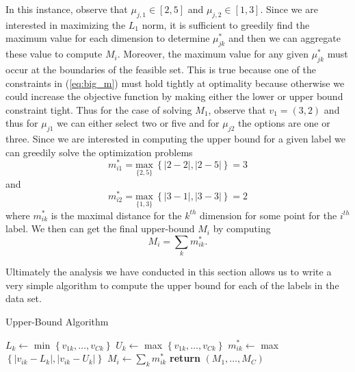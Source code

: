 \documentclass[../thesis.tex]{subfiles}
\begin{document}
In this instance, observe that $\mu_{j, 1} \in [2, 5]$ and $\mu_{j, 2} \in [1, 3]$. Since we are interested in maximizing the $L_1$ norm, it is sufficient to greedily find the maximum value for each dimension to determine $\mu_{jk}^*$ and then we can aggregate these value to compute $M_i$. Moreover, the maximum value for any given $\mu_{jk}^*$ must occur at the boundaries of the feasible set. This is true because one of the constraints in (\ref{eq:big_m}) must hold tightly at optimality because otherwise we could increase the objective function by making either the lower or upper bound constraint tight. Thus for the case of solving $M_1$, observe that $v_1 = (3, 2)$ and thus for $\mu_{j1}$ we can either select two or five and for $\mu_{j2}$ the options are one or three. Since we are interested in computing the upper bound for a given label we can greedily solve the optimization problems
\begin{equation*}
    m_{i1}^* = \underset{\{2, 5\}}{\text{max}} \ \left\{|2-2|, |2-5|\right\} = 3
\end{equation*}
and
\begin{equation*}
    m_{i2}^* = \underset{\{1, 3\}}{\text{max}} \ \left\{|3-1|, |3-3|\right\} = 2
\end{equation*}
where $m_{ik}^*$ is the maximal distance for the $k^{th}$ dimension for some point for the $i^{th}$ label. We then can get the final upper-bound $M_i$ by computing
\begin{equation}
    M_i = \sum_k m_{ik}^*.
\end{equation}

Ultimately the analysis we have conducted in this section allows us to write a very simple algorithm to compute the upper bound for each of the labels in the data set. 

\begin{algorithm}
    \caption{Upper-Bound Algorithm}
    \label{alg:upperbound}
    \begin{algorithmic}[1]
             
                \State $L_k \gets$ min $\left\{v_{1k}, \ldots, v_{Ck}\right\}$
                \State $U_k \gets$ max $\left\{v_{1k}, \ldots, v_{Ck}\right\}$
            \EndFor
             
                    \State $m_{ik}^* \gets$ max $\left\{|v_{ik} - L_k|, |v_{ik} - U_k|\right\}$
                \EndFor
                \State $M_i \gets \sum_k m_{ik}^*$
            \EndFor
            \State \textbf{return} $(M_1, \ldots, M_C)$
        \EndProcedure
    \end{algorithmic}
\end{algorithm}
\end{document}
